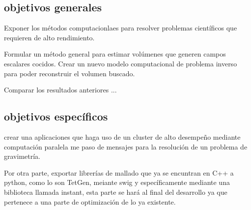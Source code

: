 \subsection{objetivos generales}
Exponer los métodos computacionlaes para resolver problemas científicos que
requieren de alto rendimiento.

Formular un método general para estimar volúmenes que generen campos
escalares cocidos. Crear un nuevo modelo computacional de problema
inverso para poder reconstruir el volumen buscado.

Comparar los resultados anteriores ...


\subsection{objetivos específicos}

crear una aplicaciones que haga uso de un cluster de alto desempeño mediante
computación paralela me paso de mensajes para la resolución de un problema de
gravimetría.

Por otra parte, exportar librerías de mallado que ya se encuntran en
C++ a python, como lo son TetGen, meiante swig y específicamente
mediante una biblioteca llamada instant, esta parte se hará al final
del desarrollo ya que pertenece a una parte de optimización de lo ya
existente.


